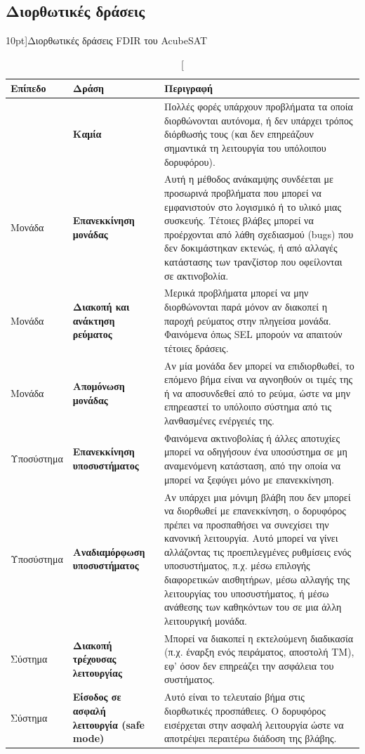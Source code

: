 \documentclass[a4paper,nobib]{tufte-book}
\begin{document}
\clearpage
\subsection{Διορθωτικές δράσεις}

\begin{table}[h]
	\centering
	\caption[][10pt]{Διορθωτικές δράσεις \acs{FDIR} του AcubeSAT}
	\label{tab:fdir_corrective}
	\renewcommand{\arraystretch}{1.5}
	\begin{tabularx}{\textwidth}{@{}lL{3cm}X@{}}
		\toprule
		Επίπεδο & Δράση & Περιγραφή \\ \midrule
		& \textbf{Καμία} & Πολλές φορές υπάρχουν προβλήματα τα οποία διορθώνονται αυτόνομα, ή δεν υπάρχει τρόπος διόρθωσής τους (και δεν επηρεάζουν σημαντικά τη λειτουργία του υπόλοιπου δορυφόρου). \\
		Μονάδα & \textbf{Επανεκκίνηση μονάδας} & Αυτή η μέθοδος ανάκαμψης συνδέεται με προσωρινά προβλήματα που μπορεί να εμφανιστούν στο λογισμικό ή το υλικό μιας συσκευής. Τέτοιες βλάβες μπορεί να προέρχονται από λάθη σχεδιασμού (bugs) που δεν δοκιμάστηκαν εκτενώς, ή από αλλαγές κατάστασης των τρανζίστορ που οφείλονται σε ακτινοβολία. \\
		Μονάδα & \textbf{Διακοπή και ανάκτηση ρεύματος} & Μερικά προβλήματα μπορεί να μην διορθώνονται παρά μόνον αν διακοπεί η παροχή ρεύματος στην πληγείσα μονάδα. Φαινόμενα όπως SEL μπορούν να απαιτούν τέτοιες δράσεις. \\
		Μονάδα & \textbf{Απομόνωση μονάδας} & Αν μία μονάδα δεν μπορεί να επιδιορθωθεί, το επόμενο βήμα είναι να αγνοηθούν οι τιμές της ή να αποσυνδεθεί από το ρεύμα, ώστε να μην επηρεαστεί το υπόλοιπο σύστημα από τις λανθασμένες ενέργειές της. \\
		Υποσύστημα & \textbf{Επανεκκίνηση υποσυστήματος} & Φαινόμενα ακτινοβολίας ή άλλες αποτυχίες μπορεί να οδηγήσουν ένα υποσύστημα σε μη αναμενόμενη κατάσταση, από την οποία να μπορεί να ξεφύγει μόνο με επανεκκίνηση. \\
		Υποσύστημα & \textbf{Αναδιαμόρφωση υποσυστήματος} & Αν υπάρχει μια μόνιμη βλάβη που δεν μπορεί να διορθωθεί με επανεκκίνηση, ο δορυφόρος πρέπει να προσπαθήσει να συνεχίσει την κανονική λειτουργία. Αυτό μπορεί να γίνει αλλάζοντας τις προεπιλεγμένες ρυθμίσεις ενός υποσυστήματος, π.χ. μέσω επιλογής διαφορετικών αισθητήρων, μέσω αλλαγής της λειτουργίας του υποσυστήματος, ή μέσω ανάθεσης των καθηκόντων του σε μια άλλη λειτουργική μονάδα. \\
		Σύστημα & \textbf{Διακοπή τρέχουσας λειτουργίας} & Μπορεί να διακοπεί η εκτελούμενη διαδικασία (π.χ. έναρξη ενός πειράματος, αποστολή TM), εφ' όσον δεν επηρεάζει την ασφάλεια του συστήματος. \\
		Σύστημα & \textbf{Είσοδος σε ασφαλή λειτουργία (safe mode)} & Αυτό είναι το τελευταίο βήμα στις διορθωτικές προσπάθειες. Ο δορυφόρος εισέρχεται στην ασφαλή λειτουργία ώστε να αποτρέψει περαιτέρω διάδοση της βλάβης. \\ \bottomrule
	\end{tabularx}
\end{table}
\end{document}
